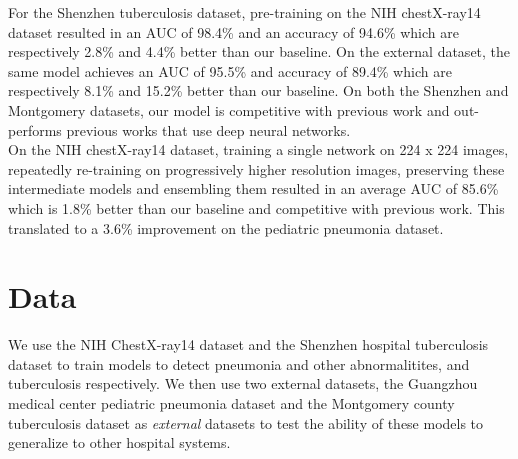 \documentclass[12pt,oneside,a4paper]{report}
\begin{document}
For the Shenzhen tuberculosis dataset, pre-training on the NIH chestX-ray14
dataset resulted in an AUC of 98.4\% and an accuracy of 94.6\% which are
respectively 2.8\% and 4.4\% better than our baseline. On the external dataset,
the same model achieves an AUC of 95.5\% and accuracy of 89.4\% which are
respectively 8.1\% and 15.2\% better than our baseline. On both the Shenzhen and
Montgomery datasets, our model is competitive with previous work and
out-performs previous works that use deep neural networks.\\

On the NIH chestX-ray14 dataset, training a single network on 224 x 224 images,
repeatedly re-training on progressively higher resolution images, preserving
these intermediate models and ensembling them resulted in an average AUC of
85.6\% which is 1.8\% better than our baseline and competitive with previous
work. This translated to a 3.6\% improvement on the pediatric pneumonia
dataset.\\



\chapter{Data\label{data}}
We use the NIH ChestX-ray14 dataset\cite{Wang2017} and the Shenzhen hospital
tuberculosis dataset\cite{jaeger2014two} to train models to detect pneumonia and
other abnormalitites, and tuberculosis respectively. We then use two external
datasets, the Guangzhou medical center pediatric pneumonia
dataset\cite{kermany2018identifying} and the Montgomery county tuberculosis
dataset\cite{jaeger2014two} as \emph{external} datasets to test the ability of
these models to generalize to other hospital systems.
\end{document}
